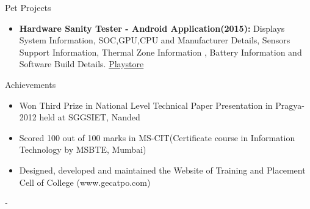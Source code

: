 \documentclass[]{mcdowellcv}
\begin{document}
	\begin{cvsection}{Pet Projects}
		\begin{cvsubsection}{}{}{}	
			\begin{itemize}
				\item \textbf{Hardware Sanity Tester - Android Application(2015): } Displays System Information, SOC,GPU,CPU and Manufacturer Details, Sensors Support Information, Thermal Zone Information , Battery Information and Software Build Details. \href{https://play.google.com/store/apps/details?id=com.pawanbathe.hardwaresanitytester}{Playstore}
			\end{itemize}
		\end{cvsubsection}
	\end{cvsection}
	
	\begin{cvsection}{Achievements}
		\begin{cvsubsection}{}{}{}	
			\begin{itemize}
				\item Won Third Prize in National Level Technical Paper Presentation in Pragya-2012 held at SGGSIET, Nanded
				\item Scored 100 out of 100 marks in MS-CIT(Certificate course in Information Technology by MSBTE, Mumbai)
				\item Designed, developed and maintained the Website of Training and Placement Cell of College (www.gecatpo.com)
			\end{itemize}
		\end{cvsubsection}
	\end{cvsection}	
	⁃	
\end{document}
